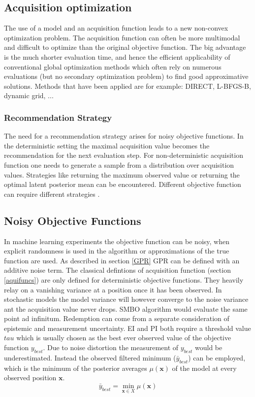\documentclass[english]{article}
\newcommand{\x}{\mathbf{x}}
\begin{document}
\subsection*{Acquisition optimization}
The use of a model and an acquisition function leads to a new non-convex optimization problem. The acquisition function can often be more multimodal and difficult to optimize than the original objective function. The big advantage is the much shorter evaluation time, and hence the efficient applicability of conventional global optimization methods which often rely on numerous evaluations (but no secondary optimization problem) to find good approximative solutions.
Methods that have been applied are for example: DIRECT, L-BFGS-B, dynamic grid, ...

\subsubsection*{Recommendation Strategy}
The need for a recommendation strategy arises for noisy objective functions. In the deterministic setting the maximal acquisition value becomes the recommendation for the next evaluation step. For non-deterministic acquisition function one needs to generate a sample from a distribution over acquisition values. Strategies like returning the maximum observed value or returning the optimal latent posterior mean can be encountered. Different objective function can require different strategies \cite{hoffman_modular_2014}.

\subsection{Noisy Objective Functions}
In machine learning experiments the objective function can be noisy, when explicit randomness is used in the algorithm or approximations of the true function are used. As described in section \ref{GPR} GPR can be defined with an additive noise term. The classical defintions of acquisition function (section \ref{aquifuncs}) are only defined for deterministic objective functions. They heavily relay on a vanishing variance at a position once it has been observed.  In stochastic models the model variance will however converge to the noise variance ant the acquisition value never drops. SMBO algorithm would evaluate the same point ad infinitum. Redemption can come from a separate consideration of epistemic and measurement uncertainty.
EI and PI both require a threshold value $tau$ which is usually chosen as the best ever observed value of the objective function $y_{best}$. Due to noise distortion the measurement of $y_{best}$ would be underestimated.  Instead the observed filtered minimum ($\bar{y}_{best}$) can be employed, which is the minimum of the posterior averages $\mu(\x)$ of the model at every observed position $\x$.
\begin{equation}
  \bar{y}_{best} = \min_{\x \in X} \mu(\x)
\end{equation}
\end{document}

